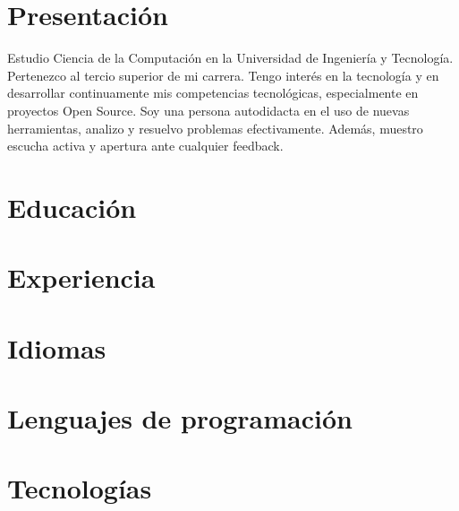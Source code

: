 \documentclass[10pt, a4paper]{moderncv}
\begin{document}
\maketitle
\section{Presentación}
Estudio Ciencia de la Computación en la Universidad de Ingeniería y Tecnología.
Pertenezco al tercio superior de mi carrera.
Tengo interés en la tecnología y en desarrollar continuamente mis competencias tecnológicas, especialmente en proyectos Open Source.
Soy una persona autodidacta en el uso de nuevas herramientas, analizo y resuelvo problemas efectivamente.
Además, muestro escucha activa y apertura ante cualquier feedback.

\section{Educación}

\section{Experiencia}

\section{Idiomas}


\section{Lenguajes de programación}

\section{Tecnologías}
\end{document}
